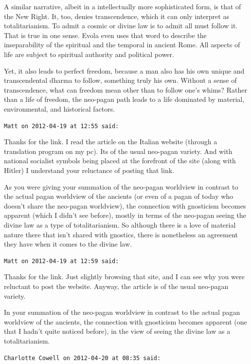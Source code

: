 \begin{footnotesize}
\begin{sffamily}
A similar narrative, albeit in a intellectually more sophisticated form, is that of the New Right. It, too, denies transcendence, which it can only interpret as totalitarianism. To admit a cosmic or divine law is to admit all must follow it. That is true in one sense. Evola even uses that word to describe the inseparability of the spiritual and the temporal in ancient Rome. All aspects of life are subject to spiritual authority and political power.

Yet, it also leads to perfect freedom, because a man also has his own unique and transcendental dharma to follow, something truly his own. Without a sense of transcendence, what can freedom mean other than to follow one's whims? Rather than a life of freedom, the neo-pagan path leads to a life dominated by material, environmental, and historical factors.

\hfill

\texttt{Matt on 2012-04-19 at 12:55 said:}

Thanks for the link. I read the article on the Italian website (through a translation program on my pc). Its of the usual neo-pagan variety. And with national socialist symbols being placed at the forefront of the site (along with Hitler) I understand your reluctance of posting that link.

As you were giving your summation of the neo-pagan worldview in contrast to the actual pagan worldview of the ancients (or even of a pagan of today who doesn't share the neo-pagan worldview), the connection with gnosticism becomes apparent (which I didn't see before), mostly in terms of the neo-pagan seeing the divine law as a type of totalitarianism. So although there is a love of material nature there that isn't shared with gnostics, there is nonetheless an agreement they have when it comes to the divine law.

\hfill

\texttt{Matt on 2012-04-19 at 12:59 said:}

Thanks for the link. Just slightly browsing that site, and I can see why you were reluctant to post the website. Anyway, the article is of the usual neo-pagan variety.

In your summation of the neo-pagan worldview in contrast to the actual pagan worldview of the ancients, the connection with gnosticism becomes apparent (one that I hadn't quite noticed before), in the view of seeing the divine law as a totalitarianism.

\hfill

\texttt{Charlotte Cowell on 2012-04-20 at 08:35 said:}


\end{sffamily}
\end{footnotesize}
